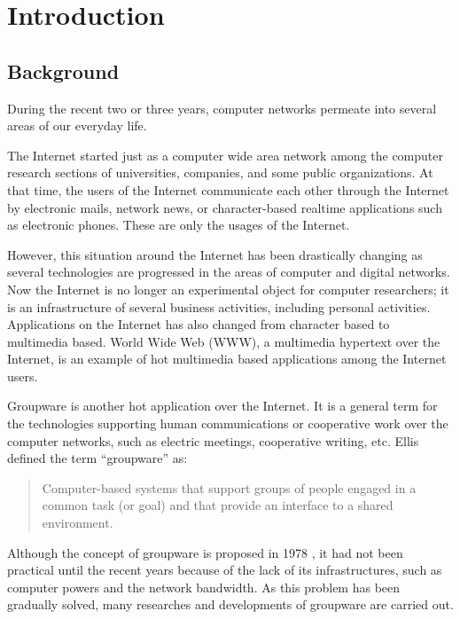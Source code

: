 
\chapter{Introduction}

\section{Background}
\label{sec:background}

During the recent two or three years, computer networks permeate into 
several areas of our everyday life.

The Internet started just as a computer wide area network among the 
computer research sections of universities, companies, and some public 
organizations.  At that time, the users of the Internet communicate 
each other through the Internet by electronic mails, network news, or 
character-based realtime applications such as electronic phones.  
These are only the usages of the Internet.

\begin{sloppypar}
 However, this situation around the Internet has been drastically 
 changing as several technologies are progressed in the areas of 
 computer and digital networks.  Now the Internet is no longer an 
 experimental object for computer researchers; it is an infrastructure 
 of several business activities, including personal activities.  
 Applications on the Internet has also changed from character based to 
 multimedia based.  World Wide Web (WWW), a multimedia hypertext over 
 the Internet, is an example of hot multimedia based applications 
 among the Internet users.
\end{sloppypar}

Groupware is another hot application over the Internet.  It is a
general term for the technologies supporting human communications or
cooperative work over the computer networks, such as electric meetings,
cooperative writing, etc.  Ellis \cite{ellis:cacm91} defined the term
``groupware'' as:
\begin{quote}
 Computer-based systems that support groups of people engaged in a
 common task (or goal) and that provide an interface to a shared
 environment.
\end{quote}
Although the concept of groupware is proposed in 1978
\cite{johnson-lentz82:groupware}, it had not been practical until the
recent years because of the lack of its infrastructures, such as
computer powers and the network bandwidth.  As this problem has been
gradually solved, many researches and developments of groupware are
carried out.

